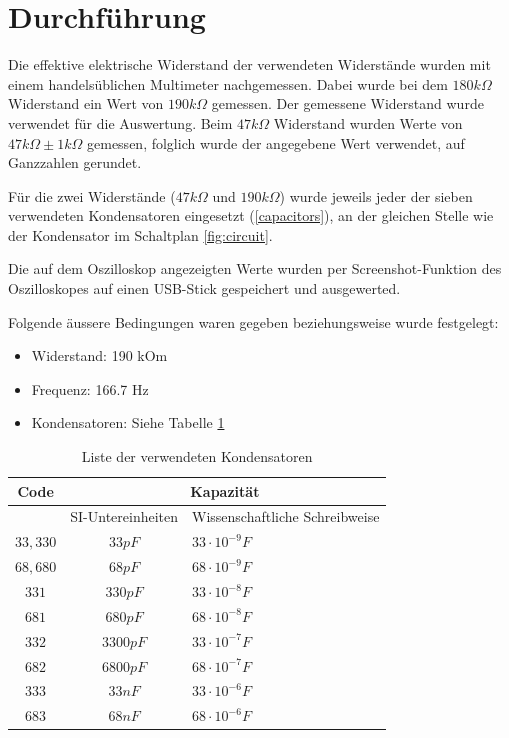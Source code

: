 \documentclass{article}
\begin{document}
\section{Durchführung}

Die effektive elektrische Widerstand der verwendeten Widerstände wurden mit einem handelsüblichen Multimeter nachgemessen. Dabei wurde bei dem $180k\Omega$ Widerstand ein Wert von $190k\Omega$ gemessen. Der gemessene Widerstand wurde verwendet für die Auswertung. Beim $47k\Omega$ Widerstand wurden Werte von $47k\Omega \pm 1k\Omega$ gemessen, folglich wurde der angegebene Wert verwendet, auf Ganzzahlen gerundet.

Für die zwei Widerstände ($47k\Omega$ und $190k\Omega$) wurde jeweils jeder der sieben verwendeten Kondensatoren eingesetzt (\ref{capacitors}), an der gleichen Stelle wie der Kondensator im Schaltplan \ref{fig:circuit}.

Die auf dem Oszilloskop angezeigten Werte wurden per Screenshot-Funktion des Oszilloskopes auf einen USB-Stick gespeichert und ausgewerted. 

Folgende äussere Bedingungen waren gegeben beziehungsweise wurde festgelegt:
\begin{itemize}
    \item Widerstand: 190 kOm
    \item Frequenz: 166.7 Hz
    \item Kondensatoren: Siehe Tabelle \ref{tab:capacitors}
\end{itemize}

\begin{table}[ht]
    \centering
    \begin{tabular}{c|c|p{2.5cm}}
         Code       & \multicolumn{2}{c}{Kapazität} \\
         \hline\hline
                    & SI-Untereinheiten & Wissenschaftliche Schreibweise \\
         \hline
         $33, 330$  & $33p F$   & $33 \cdot 10^{-9} F$ \\
         $68, 680$  & $68p F$   & $68 \cdot 10^{-9} F$ \\
         $331$      & $330p F$  & $33 \cdot 10^{-8} F$ \\
         $681$      & $680p F$  & $68 \cdot 10^{-8} F$ \\
         $332$      & $3300p F$ & $33 \cdot 10^{-7} F$ \\
         $682$      & $6800p F$ & $68 \cdot 10^{-7} F$ \\
         $333$      & $33n F$   & $33 \cdot 10^{-6} F$ \\
         $683$      & $68n F$   & $68 \cdot 10^{-6} F$ \\
    \end{tabular}
    \caption{Liste der verwendeten Kondensatoren}
    \label{tab:capacitors}
\end{table}
\end{document}
